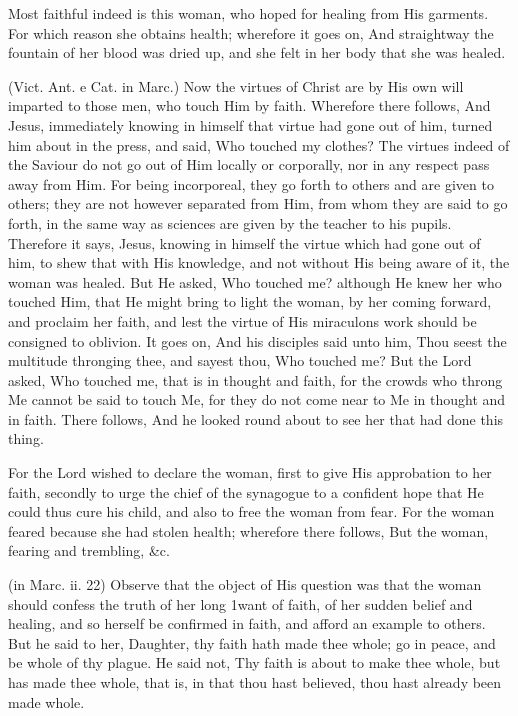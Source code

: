  Most faithful indeed is this woman, who hoped for healing from His garments. For which reason she obtains health; wherefore it goes on, And straightway the fountain of her blood was dried up, and she felt in her body that she was healed.

 (Vict. Ant. e Cat. in Marc.) Now the virtues of Christ are by His own will imparted to those men, who touch Him by faith. Wherefore there follows, And Jesus, immediately knowing in himself that virtue had gone out of him, turned him about in the press, and said, Who touched my clothes? The virtues indeed of the Saviour do not go out of Him locally or corporally, nor in any respect pass away from Him. For being incorporeal, they go forth to others and are given to others; they are not however separated from Him, from whom they are said to go forth, in the same way as sciences are given by the teacher to his pupils. Therefore it says, Jesus, knowing in himself the virtue which had gone out of him, to shew that with His knowledge, and not without His being aware of it, the woman was healed. But He asked, Who touched me? although He knew her who touched Him, that He might bring to light the woman, by her coming forward, and proclaim her faith, and lest the virtue of His miraculons work should be consigned to oblivion. It goes on, And his disciples said unto him, Thou seest the multitude thronging thee, and sayest thou, Who touched me? But the Lord asked, Who touched me, that is in thought and faith, for the crowds who throng Me cannot be said to touch Me, for they do not come near to Me in thought and in faith. There follows, And he looked round about to see her that had done this thing.

 For the Lord wished to declare the woman, first to give His approbation to her faith, secondly to urge the chief of the synagogue to a confident hope that He could thus cure his child, and also to free the woman from fear. For the woman feared because she had stolen health; wherefore there follows, But the woman, fearing and trembling, \&c.

 (in Marc. ii. 22) Observe that the object of His question was that the woman should confess the truth of her long 1want of faith, of her sudden belief and healing, and so herself be confirmed in faith, and afford an example to others. But he said to her, Daughter, thy faith hath made thee whole; go in peace, and be whole of thy plague. He said not, Thy faith is about to make thee whole, but has made thee whole, that is, in that thou hast believed, thou hast already been made whole.

